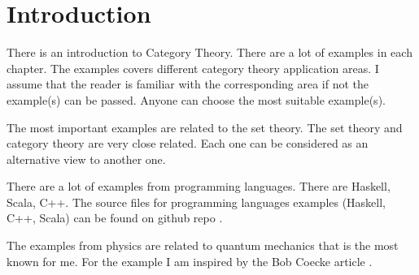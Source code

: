 \chapter*{Introduction}

There is an introduction to Category Theory. There are a lot of
examples in each chapter. The examples covers different category
theory application areas. I assume that the reader is familiar with
the corresponding area if not the example(s) can be passed. Anyone can
choose the most suitable example(s). 

The most important examples are related to the set theory. The set
theory and category theory are very close related. Each one can be
considered as an alternative view to another one.

There are a lot of examples from programming languages. There are
Haskell, Scala, C++. The source files for programming languages
examples (Haskell, C++, Scala) can be found on github repo
\cite{bib:github:ivanmurashko}.  

The examples from physics are related to quantum mechanics that is the
most known for me. For the example I am inspired by the Bob Coecke
article \cite{bib:arxiv:Bob_Coecke_2008}.




